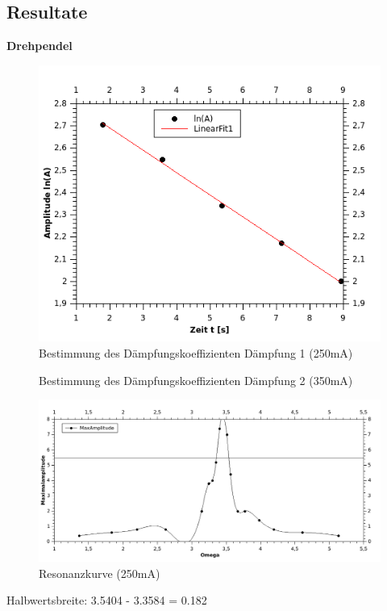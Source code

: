\documentclass[12pt,a4paper]{article}
\begin{document}
\begin{multicols}{2}
\pagebreak
\subsection{Resultate}
\textbf{Drehpendel}

\begin{figure}[H]
	\centering
	\includegraphics[scale=2]{./figure/Messung1_Daempfung_omega0.png}
	\caption{Bestimmung des Dämpfungskoeffizienten Dämpfung 1 (250mA)}
	\label{fig:daempfung_omega0_1}
\end{figure}

\begin{figure}[H]
	\centering
	\caption{Bestimmung des Dämpfungskoeffizienten Dämpfung 2 (350mA)}
	\label{fig:daempfung_omega0_2}
\end{figure}

\end{multicols}

\begin{figure}[H]
	\centering
	\includegraphics[scale=1.5]{./figure/Messung1_Resonanzkurve_250mA.png}
	\caption{Resonanzkurve (250mA)}
	\label{fig:resonanzkurve_250mA}
\end{figure}
Halbwertsbreite: 3.5404 - 3.3584 = 0.182 
\end{document}
